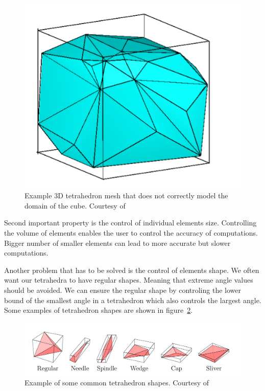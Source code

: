 \documentclass[en]{minipw} %
\begin{document}
\begin{figure}[h!]
\centering
\includegraphics[scale=0.5]{pictures/3dmesh_incomplite.png}
\caption[Logo MiNI]{Example 3D tetrahedron mesh that does not correctly model the domain of the cube. Courtesy of~\cite{delaunay_mesh}}
\label{fig:mesh_incomplete}
\end{figure}

Second important property is the control of individual elements size. Controlling the volume of elements enables the user to control the accuracy of computations. Bigger number of smaller elements can lead to more accurate but slower computations.

Another problem that has to be solved is the control of elements shape. We often want our tetrahedra to have regular shapes. Meaning that extreme angle values should be avoided. We can ensure the regular shape by controling the lower bound of the smallest angle in a tetrahedron which also controls the largest angle. Some examples of tetrahedron shapes are shown in figure~\ref{fig:tetrahedra_shapes}.

\begin{figure}[h!]
\centering
\includegraphics[scale=0.3]{pictures/tetrahedra_shapes.png}
\caption[Logo MiNI]{Example of some common tetrahedron shapes. Courtesy of~\cite{tetgen}}
\label{fig:tetrahedra_shapes}
\end{figure}
\end{document}
